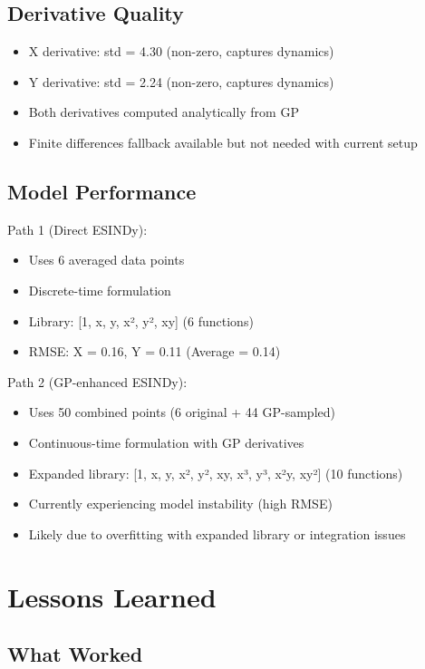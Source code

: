 \documentclass[11pt]{article}
\begin{document}
\subsection{Derivative Quality}

\begin{itemize}
    \item X derivative: std = 4.30 (non-zero, captures dynamics)
    \item Y derivative: std = 2.24 (non-zero, captures dynamics)
    \item Both derivatives computed analytically from GP
    \item Finite differences fallback available but not needed with current setup
\end{itemize}

\subsection{Model Performance}

Path 1 (Direct ESINDy):
\begin{itemize}
    \item Uses 6 averaged data points
    \item Discrete-time formulation
    \item Library: [1, x, y, x², y², xy] (6 functions)
    \item RMSE: X = 0.16, Y = 0.11 (Average = 0.14)
\end{itemize}

Path 2 (GP-enhanced ESINDy):
\begin{itemize}
    \item Uses 50 combined points (6 original + 44 GP-sampled)
    \item Continuous-time formulation with GP derivatives
    \item Expanded library: [1, x, y, x², y², xy, x³, y³, x²y, xy²] (10 functions)
    \item Currently experiencing model instability (high RMSE)
    \item Likely due to overfitting with expanded library or integration issues
\end{itemize}

\section{Lessons Learned}

\subsection{What Worked}
\end{document}
